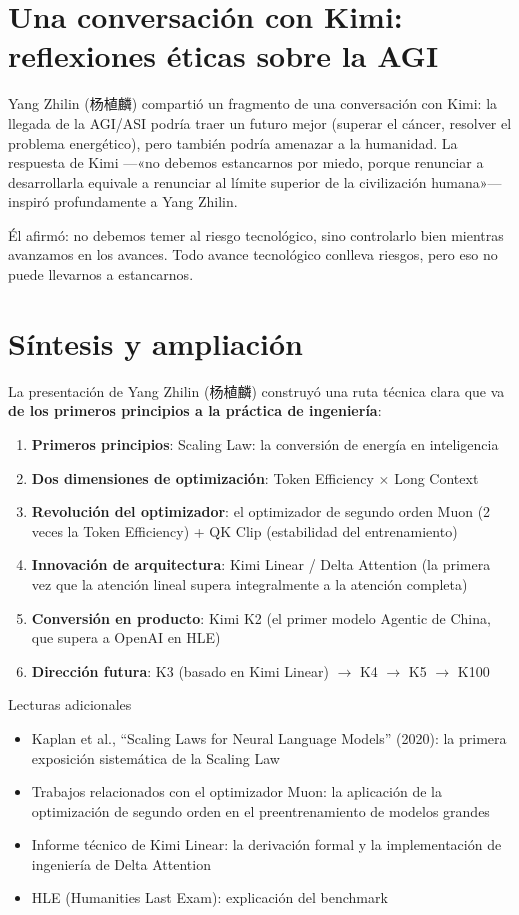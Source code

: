 \documentclass[a4paper]{article}
\begin{document}
\section{Una conversación con Kimi: reflexiones éticas sobre la AGI}

Yang Zhilin (杨植麟) compartió un fragmento de una conversación con Kimi: la llegada de la AGI/ASI podría traer un futuro mejor (superar el cáncer, resolver el problema energético), pero también podría amenazar a la humanidad. La respuesta de Kimi —«no debemos estancarnos por miedo, porque renunciar a desarrollarla equivale a renunciar al límite superior de la civilización humana»— inspiró profundamente a Yang Zhilin.

Él afirmó: no debemos temer al riesgo tecnológico, sino controlarlo bien mientras avanzamos en los avances. Todo avance tecnológico conlleva riesgos, pero eso no puede llevarnos a estancarnos.


\section{Síntesis y ampliación}

La presentación de Yang Zhilin (杨植麟) construyó una ruta técnica clara que va \textbf{de los primeros principios a la práctica de ingeniería}:

\begin{enumerate}
\item \textbf{Primeros principios}: Scaling Law: la conversión de energía en inteligencia
\item \textbf{Dos dimensiones de optimización}: Token Efficiency $\times$ Long Context
\item \textbf{Revolución del optimizador}: el optimizador de segundo orden Muon (2 veces la Token Efficiency) + QK Clip (estabilidad del entrenamiento)
\item \textbf{Innovación de arquitectura}: Kimi Linear / Delta Attention (la primera vez que la atención lineal supera integralmente a la atención completa)
\item \textbf{Conversión en producto}: Kimi K2 (el primer modelo Agentic de China, que supera a OpenAI en HLE)
\item \textbf{Dirección futura}: K3 (basado en Kimi Linear) $\rightarrow$ K4 $\rightarrow$ K5 $\rightarrow$ K100
\end{enumerate}

\begin{knowledgebox}{Lecturas adicionales}
\begin{itemize}
\item Kaplan et al., ``Scaling Laws for Neural Language Models'' (2020): la primera exposición sistemática de la Scaling Law
\item Trabajos relacionados con el optimizador Muon: la aplicación de la optimización de segundo orden en el preentrenamiento de modelos grandes
\item Informe técnico de Kimi Linear: la derivación formal y la implementación de ingeniería de Delta Attention
\item HLE (Humanities Last Exam): explicación del benchmark
\end{itemize}
\end{knowledgebox}

\end{document}
